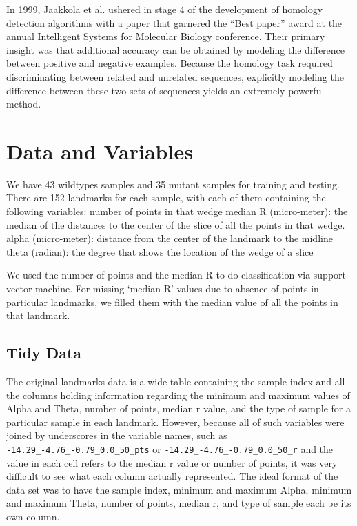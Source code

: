 \documentclass[10pt,letterpaper]{article}
\begin{document}
In 1999, Jaakkola et al. ushered in stage 4 of the development of
homology detection algorithms with a paper that garnered the ``Best
paper'' award at the annual Intelligent Systems for Molecular Biology
conference. Their primary insight was that additional accuracy can be
obtained by modeling the difference between positive and negative
examples. Because the homology task required discriminating between
related and unrelated sequences, explicitly modeling the difference
between these two sets of sequences yields an extremely powerful method.

\section{Data and Variables}\label{data-and-variables}

We have 43 wildtypes samples and 35 mutant samples for training and
testing. There are 152 landmarks for each sample, with each of them
containing the following variables: number of points in that wedge
median R (micro-meter): the median of the distances to the center of the
slice of all the points in that wedge. alpha (micro-meter): distance
from the center of the landmark to the midline theta (radian): the
degree that shows the location of the wedge of a slice

We used the number of points and the median R to do classification via
support vector machine. For missing `median R' values due to absence of
points in particular landmarks, we filled them with the median value of
all the points in that landmark.

\subsection{Tidy Data}\label{tidy-data}

The original landmarks data is a wide table containing the sample index
and all the columns holding information regarding the minimum and
maximum values of Alpha and Theta, number of points, median r value, and
the type of sample for a particular sample in each landmark. However,
because all of such variables were joined by underscores in the variable
names, such as \texttt{-14.29\_-4.76\_-0.79\_0.0\_50\_pts} or
\texttt{-14.29\_-4.76\_-0.79\_0.0\_50\_r} and the value in each cell
refers to the median r value or number of points, it was very difficult
to see what each column actually represented. The ideal format of the
data set was to have the sample index, minimum and maximum Alpha,
minimum and maximum Theta, number of points, median r, and type of
sample each be its own column.
\end{document}
